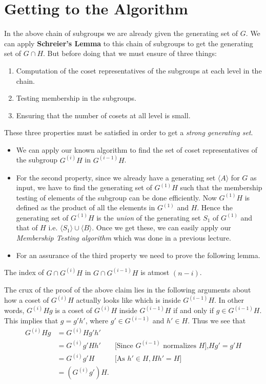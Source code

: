 \section{Getting to the Algorithm }
In the above chain of subgroups we are already given the generating set of $G$. We can apply {\bf Schreier's Lemma} to this chain of subgroups to get the generating set of $G\cap H$. But before doing that we must ensure of three things:
\begin{enumerate}
	\item Computation of the coset representatives of the subgroups at each level in the chain.
	\item Testing membership in the subgroups.
	\item Ensuring that the number of cosets at all level is small.
\end{enumerate}
These three properties must be satisfied in order to get a \emph{strong generating set}. 
\begin{itemize}
	\item We can apply our known algorithm to find the set of coset representatives of the subgroup $G^{(i)}H$ in $G^{(i-1)}H$.
	\item For the second property, since we already have a generating set $\langle A\rangle$ for $G$ as input, we have to find the generating set of $G^{(1)}H$ such that the membership testing of elements of the subgroup can be done efficiently. Now $G^{(1)}H$ is defined as the product of all the elements in $G^{(1)}$ and $H$. Hence the generating set of $G^{(1)}H$ is the \emph{union} of the generating set $S_1$ of $G^{(1)}$ and that of $H$ i.e. $\langle S_1 \rangle\cup \langle B \rangle$. Once we get these, we can easily apply our \emph{Membership Testing algorithm} which was done in a previous lecture.
	\item For an assurance of the third property we need to prove the following lemma.
\end{itemize}
\begin{claim}\label{coset}
	The index of 
	$G\cap G^{(i)}H$ in $G\cap G^{(i-1)}H$  is atmost $(n-i)$.
\end{claim}
The crux of the proof of the above claim lies in the following arguments about how a coset of $G^{(i)}H$ actually looks like which is inside $G^{(i-1)}H$. In other words, $G^{(i)}Hg$ is a coset of $G^{(i)}H$ inside $G^{(i-1)}H$ if and only if $g\in G^{(i-1)}H$. This implies that $g = g'h'$, where $g'\in G^{(i-1)}$ and $h'\in H$. Thus we see that 
\begin{eqnarray*}
	G^{(i)}Hg &= G^{(i)}Hg'h'\\
			  &= G^{(i)}g'Hh' & \text{[Since $G^{(i-1)}$ normalizes $H$],$Hg'=g'H$}\\
			  &= G^{(i)}g'H & \text{[As $h'\in H , Hh' = H$]}\\
			  &= (G^{(i)}g')H.
\end{eqnarray*}
